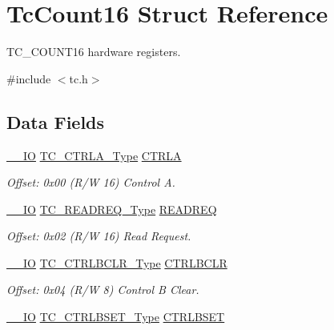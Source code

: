 \hypertarget{struct_tc_count16}{}\section{Tc\+Count16 Struct Reference}
\label{struct_tc_count16}


T\+C\+\_\+\+C\+O\+U\+N\+T16 hardware registers.  




{\ttfamily \#include $<$tc.\+h$>$}

\subsection*{Data Fields}
\begin{DoxyCompactItemize}
\item 
\mbox{\hyperlink{core__cm0plus_8h_aec43007d9998a0a0e01faede4133d6be}{\+\_\+\+\_\+\+IO}} \mbox{\hyperlink{union_t_c___c_t_r_l_a___type}{T\+C\+\_\+\+C\+T\+R\+L\+A\+\_\+\+Type}} \mbox{\hyperlink{struct_tc_count16_a282ae6be6071506774ed492a00c9a7c5}{C\+T\+R\+LA}}
\begin{DoxyCompactList}\small\item\em Offset\+: 0x00 (R/W 16) Control A. \end{DoxyCompactList}\item 
\mbox{\hyperlink{core__cm0plus_8h_aec43007d9998a0a0e01faede4133d6be}{\+\_\+\+\_\+\+IO}} \mbox{\hyperlink{union_t_c___r_e_a_d_r_e_q___type}{T\+C\+\_\+\+R\+E\+A\+D\+R\+E\+Q\+\_\+\+Type}} \mbox{\hyperlink{struct_tc_count16_a9cb0a3ec797bc9e4a1b1db94d2865b34}{R\+E\+A\+D\+R\+EQ}}
\begin{DoxyCompactList}\small\item\em Offset\+: 0x02 (R/W 16) Read Request. \end{DoxyCompactList}\item 
\mbox{\hyperlink{core__cm0plus_8h_aec43007d9998a0a0e01faede4133d6be}{\+\_\+\+\_\+\+IO}} \mbox{\hyperlink{union_t_c___c_t_r_l_b_c_l_r___type}{T\+C\+\_\+\+C\+T\+R\+L\+B\+C\+L\+R\+\_\+\+Type}} \mbox{\hyperlink{struct_tc_count16_a5d266ecd4b84c85e2136fcdfcdd1e57f}{C\+T\+R\+L\+B\+C\+LR}}
\begin{DoxyCompactList}\small\item\em Offset\+: 0x04 (R/W 8) Control B Clear. \end{DoxyCompactList}\item 
\mbox{\hyperlink{core__cm0plus_8h_aec43007d9998a0a0e01faede4133d6be}{\+\_\+\+\_\+\+IO}} \mbox{\hyperlink{union_t_c___c_t_r_l_b_s_e_t___type}{T\+C\+\_\+\+C\+T\+R\+L\+B\+S\+E\+T\+\_\+\+Type}} \mbox{\hyperlink{struct_tc_count16_aad77cd2b986ac4f6e8112f1d8ef850a5}{C\+T\+R\+L\+B\+S\+ET}}

\end{DoxyCompactItemize}
